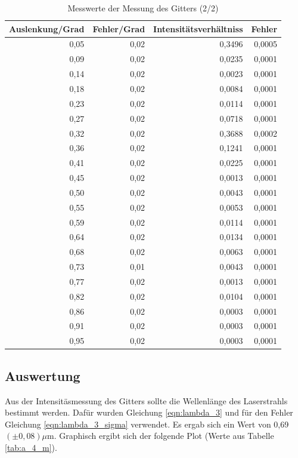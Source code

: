 \documentclass[12pt]{scrartcl}
\begin{document}
\begin{table}[H]
\caption{Messwerte der Messung des Gitters (2/2)}
\begin{center}
\begin{tabular}{|r|r|r|r|}
\hline
\multicolumn{1}{|l|}{Auslenkung/Grad} & \multicolumn{1}{l|}{Fehler/Grad} & \multicolumn{1}{l|}{Intensitätsverhältniss} & \multicolumn{1}{l|}{Fehler} \\ \hline
0,05 & 0,02 & 0,3496 & 0,0005 \\ \hline
0,09 & 0,02 & 0,0235 & 0,0001 \\ \hline
0,14 & 0,02 & 0,0023 & 0,0001 \\ \hline
0,18 & 0,02 & 0,0084 & 0,0001 \\ \hline
0,23 & 0,02 & 0,0114 & 0,0001 \\ \hline
0,27 & 0,02 & 0,0718 & 0,0001 \\ \hline
0,32 & 0,02 & 0,3688 & 0,0002 \\ \hline
0,36 & 0,02 & 0,1241 & 0,0001 \\ \hline
0,41 & 0,02 & 0,0225 & 0,0001 \\ \hline
0,45 & 0,02 & 0,0013 & 0,0001 \\ \hline
0,50 & 0,02 & 0,0043 & 0,0001 \\ \hline
0,55 & 0,02 & 0,0053 & 0,0001 \\ \hline
0,59 & 0,02 & 0,0114 & 0,0001 \\ \hline
0,64 & 0,02 & 0,0134 & 0,0001 \\ \hline
0,68 & 0,02 & 0,0063 & 0,0001 \\ \hline
0,73 & 0,01 & 0,0043 & 0,0001 \\ \hline
0,77 & 0,02 & 0,0013 & 0,0001 \\ \hline
0,82 & 0,02 & 0,0104 & 0,0001 \\ \hline
0,86 & 0,02 & 0,0003 & 0,0001 \\ \hline
0,91 & 0,02 & 0,0003 & 0,0001 \\ \hline
0,95 & 0,02 & 0,0003 & 0,0001 \\ \hline
\end{tabular}
\end{center}
\label{tab:a_4_e_b}
\end{table}



\subsection{Auswertung}
Aus der Intensitäsmessung des Gitters sollte die Wellenlänge des Laserstrahls bestimmt werden. Dafür wurden Gleichung \ref{eqn:lambda_3} und für den Fehler Gleichung \ref{eqn:lambda_3_sigma} verwendet. Es ergab sich ein Wert von 0,69 $(\pm  0,08)\mu$m. Graphisch ergibt sich der folgende Plot (Werte aus Tabelle \ref{tab:a_4_m}).
\end{document}
